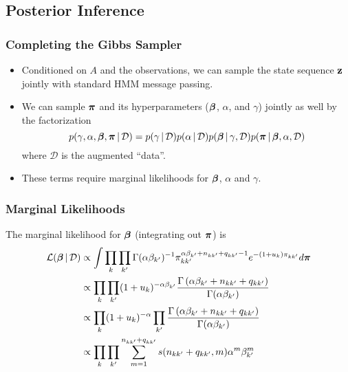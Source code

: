 \documentclass[11pt, serif, mathserif, table,trans]{beamer}
\begin{document}
\subsection{Posterior Inference}
\begin{frame}
  \frametitle{Completing the Gibbs Sampler}
  \begin{itemize}[<+->]
  \item Conditioned on $A$ and the observations, we can sample the
    state sequence $\mathbf{z}$ jointly with standard HMM message passing.
  \item We can sample $\boldsymbol{\pi}$ and its hyperparameters ($\boldsymbol{\beta}$,
    $\alpha$, and $\gamma$) jointly as well by the factorization
    \begin{equation}
      \label{eq:22}
      p(\gamma, \alpha, \boldsymbol{\beta}, \boldsymbol{\pi} \, \vert \, \mathcal{D}) = p(\gamma
      \, \vert \, \mathcal{D}) p(\alpha \, \vert \, \mathcal{D}) p(\boldsymbol{\beta} \, \vert \,
      \gamma, \mathcal{D}) p(\boldsymbol{\pi} \, \vert \, \boldsymbol{\beta}, \alpha, \mathcal{D})
    \end{equation}
    where $\mathcal{D}$ is the augmented ``data''.
  \item These terms require marginal likelihoods for $\boldsymbol{\beta}$,
    $\alpha$ and $\gamma$.
  \end{itemize}
\end{frame}
\begin{frame}
  \frametitle{Marginal Likelihoods}
  The marginal likelihood for $\boldsymbol{\beta}$ (integrating out $\boldsymbol{\pi}$)
    is
    \begin{align}
      \label{eq:23}
      \mathcal{L}(\boldsymbol{\beta} \, \vert \, \mathcal{D}) &\propto \int \prod_{k}
      \prod_{k'} \Gamma(\alpha\beta_{k'})^{-1} \pi_{kk'}^{\alpha\beta_{k'} + n_{kk'} + q_{kk'} - 1}
      e^{-(1 + u_k)\pi_{kk'}} d\boldsymbol{\pi} \\
      &\propto \prod_{k} \prod_{k'} (1 + u_k)^{-\alpha\beta_{k'}}
      \frac{\Gamma\left(\alpha\beta_{k'} + n_{kk'} +
          q_{kk'}\right)}{\Gamma(\alpha\beta_{k'})} \\
      &\propto \prod_{k} (1 + u_{k})^{-\alpha} \prod_{k'} \frac{\Gamma\left(\alpha\beta_{k'} + n_{kk'} +
          q_{kk'}\right)}{\Gamma(\alpha\beta_{k'})} \\
      &\propto \prod_{k} \prod_{k'} \sum_{m=1}^{n_{kk'} + q_{kk'}}
      s(n_{kk'} + q_{kk'}, m) \alpha^m \beta_{k'}^m
    \end{align}
\end{frame}
\end{document}

